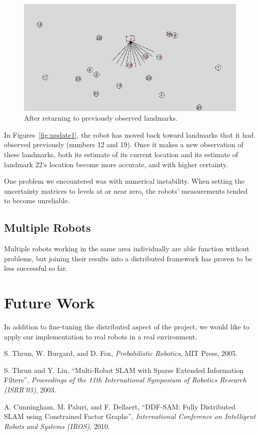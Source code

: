 \documentclass[prodmode,acmtecs]{acmsmall} %
\begin{document}
\begin{figure}[h!]
\includegraphics[width=\textwidth]{update2.png}
\caption{After returning to previously observed landmarks.}
\label{fig:update2}
\end{figure}

In Figures~\ref{fig:update1}, the robot has moved back toward landmarks that it had observed previously (numbers 12 and 19).  Once it makes a new observation of these landmarks, both its estimate of its current location and its estimate of landmark 22's location become more accurate, and with higher certainty.

One problem we encountered was with numerical instability.  When setting the uncertainty matrices to levels at or near zero, the robots' measurements tended to become unreliable.  

\subsection{Multiple Robots}

Multiple robots working in the same area individually are able function without problems, but joining their results into a distributed framework has proven to be less successful so far.

\section{Future Work}

In addition to fine-tuning the distributed aspect of the project, we would like to apply our implementation to real robots in a real environment.

\begin{thebibliography}{12}
        S. Thrun, W. Burgard, and D. Fox, \emph{Probabilistic Robotics}, MIT Press, 2005.

        S. Thrun and Y. Liu, ``Multi-Robot SLAM with Sparse Extended Information Filters'', \emph{Proceedings of the 11th International Symposium of Robotics Research (ISRR'03)}, 2003.

        A. Cunningham, M. Paluri, and F. Dellaert, ``DDF-SAM: Fully Distributed SLAM using Constrained Factor Graphs'', \emph{International Conference on Intelligent Robots and Systems (IROS)}, 2010.

\end{thebibliography}
\end{document}
